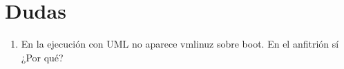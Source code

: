 \chapter[Dudas]{Dudas}
\begin{enumerate}
    \item En la ejecución con UML no aparece vmlinuz sobre boot. En el anfitrión sí ¿Por qué?
\end{enumerate}